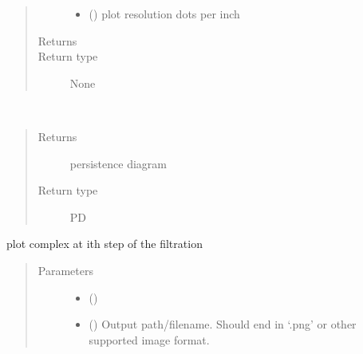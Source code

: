 \documentclass[letterpaper,10pt,openany,oneside,english]{sphinxmanual}
\begin{document}
\begin{fulllineitems}
\begin{fulllineitems}
\begin{quote}
\begin{description}
\begin{itemize}
\item {} 
 () \textendash{} plot resolution \textendash{} dots per inch

\end{itemize}

\item[{Returns}] \leavevmode


\item[{Return type}] \leavevmode
None

\end{description}\end{quote}

\end{fulllineitems}


\begin{fulllineitems}
\label{\detokenize{phomology:phomology.Filtration.pd}}~\begin{quote}\begin{description}
\item[{Returns}] \leavevmode
persistence diagram

\item[{Return type}] \leavevmode
PD

\end{description}\end{quote}

\end{fulllineitems}


\begin{fulllineitems}
\label{\detokenize{phomology:phomology.Filtration.plot_complex}}
plot complex at ith step of the filtration
\begin{quote}\begin{description}
\item[{Parameters}] \leavevmode\begin{itemize}
\item {} 
 () \textendash{} 

\item {} 
 () \textendash{} Output path/filename. Should end in ‘.png’ or other supported image
format.


\end{itemize}
\end{description}
\end{quote}
\end{fulllineitems}
\end{fulllineitems}
\end{document}
